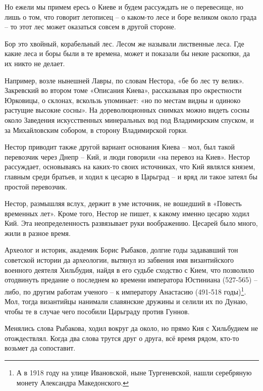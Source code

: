 Но ежели мы примем ересь о Киеве и будем рассуждать не о перевесище, но лишь о том, что говорит летописец – о каком-то лесе и боре великом около града – то этот лес может оказаться совсем в другой стороне.

Бор это хвойный, корабельный лес. Лесом же называли лиственные леса. Где какие леса и боры были в те времена, может и показали бы некие раскопки, да их никто не делает. 

Например, возле нынешней Лавры, по словам Нестора, «бе бо лес ту велик». Закревский во втором томе «Описания Киева»\cite{zakr01}, рассказывая про окрестности Юрковицы, о склонах, вскользь упоминает: «но по местам видны и одиноко растущие высокие сосны». На дореволюционных снимках можно видеть сосны около Заведения искусственных минеральных вод под Владимирским спуском, и за Михайловским собором, в сторону Владимирской горки.

Нестор приводит также другой вариант основания Киева – мол, был такой перевозчик через Днепр – Кий, и люди говорили  «на перевоз на Киев». Нестор рассуждает, основываясь на каких-то своих источниках, что Кий являлся князем, главным среди братьев, и ходил к цесарю в Царьград – и вряд ли такое затеял бы простой перевозчик. 

Нестор, размышляя вслух, держит в уме источник, не вошедший в «Повесть временных лет». Кроме того, Нестор не пишет, к какому именно цесарю ходил Кий. Эта неопределенность развязывает руки воображению. Цесарей было много, жили в разное время.

Археолог и историк, академик Борис Рыбаков, долгие годы задававший тон советской истории да археологии, вытянул из забвения имя византийского военного деятеля Хильбудия, найдя в его судьбе сходство с Кием, что позволило отодвинуть предание о последнем ко времени императора Юстиниана (527-565) – либо, по другим работам ученого – к императору Анастасию (491-518 годы)\footnote{А в 1918 году на улице Ивановской, ныне Тургеневской, нашли серебряную монету Александра Македонского.}. Мол, тогда византийцы нанимали славянские дружины и селили их по Дунаю, чтобы те в случае чего пособили Царьграду против Гуннов.

Менялись слова Рыбакова, ходил вокруг да около, но прямо Кия с Хильбудием не отождествлял. Когда два слова трутся друг о друга, всё время рядом, кто-то возьмет да сопоставит.
